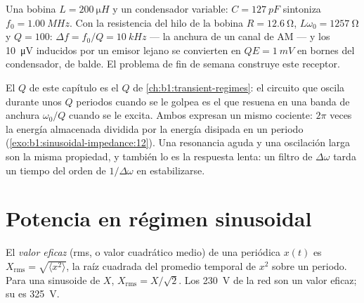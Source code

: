\begin{example}\label{ex:b1:sinusoidal-impedance:radio}
Una bobina $L = \qty{200}{\micro H}$ y un condensador variable: $C =
\qty{127}{pF}$ sintoniza $f_0 = \qty{1.00}{MHz}$. Con la resistencia del
hilo de la bobina $R = \qty{12.6}{\ohm}$, $L\omega_0 = \qty{1257}{\ohm}$ y
$Q = 100$:  $\Delta f = f_0/Q = \qty{10}{kHz}$ --- la
anchura de un canal de AM --- y los \qty{10}{\micro V} inducidos por un
emisor lejano se convierten en $QE = \qty{1}{mV}$ en bornes del
condensador, de balde. El problema de fin de semana construye este receptor.
\end{example}

\begin{remark}\label{rem:b1:sinusoidal-impedance:Q}
El $Q$ de este capítulo es el $Q$ de \cref{ch:b1:transient-regimes}: el
circuito que oscila durante unos $Q$ periodos cuando se le golpea es el
que resuena en una banda de anchura $\omega_0/Q$ cuando se le excita.
Ambos expresan un mismo cociente: $2\pi$ veces la energía almacenada
dividida por la energía disipada en un periodo
(\cref{exo:b1:sinusoidal-impedance:12}). Una resonancia aguda y una
oscilación larga son la misma propiedad, y también lo es la respuesta
lenta: un filtro de  $\Delta\omega$ tarda un tiempo del
orden de $1/\Delta\omega$ en estabilizarse.
\end{remark}

\section{Potencia en régimen sinusoidal}

\begin{definition}\label{def:b1:sinusoidal-impedance:rms}
El \emph{valor eficaz} (rms, o valor cuadrático medio) de una
 periódica $x(t)$ es $X_{\mathrm{rms}} = \sqrt{\langle x^2\rangle}$,
la raíz cuadrada del promedio temporal de $x^2$ sobre un periodo. Para
una sinusoide de  $X$, $X_{\mathrm{rms}} = X/\sqrt2$. Los
\qty{230}{V} de la red son un valor eficaz; su  es \qty{325}{V}.
\end{definition}

